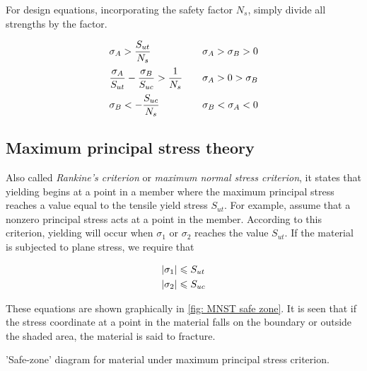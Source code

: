 \documentclass[
10pt,
a4paper,
openany,
svgnames,
]{kaobook} %
\begin{document}
For design equations, incorporating the safety factor $N_s$, simply divide all strengths by the factor.

\begin{equation}
  \begin{array}{l l l}
  \sigma_A > \dfrac{S_{ut}}{N_s} & & \sigma_A > \sigma_B > 0 \\[10pt]
  \dfrac{\sigma_A}{S_{ut}} - \dfrac{\sigma_B}{S_{uc}} > \dfrac{1}{N_s} & & \sigma_A > 0 > \sigma_B \\[10pt]
    \sigma_B <  -\dfrac{S_{uc}}{N_s} & & \sigma_B < \sigma_A < 0
  \end{array}
\end{equation}

\subsection{Maximum principal stress theory}

Also called \emph{Rankine’s criterion} or \emph{maximum normal stress criterion}, it states that yielding begins at a point in a member where the maximum principal stress reaches a value equal to the tensile yield stress $S_{ut}$. For example, assume that a nonzero principal stress acts at a point in the member. According to this criterion, yielding will occur when $\sigma_1$ or $\sigma_2$ reaches the value $S_{ut}$. If the material is subjected to plane stress, we require that

\[\begin{gathered}
    \left| \sigma _1 \right| \leqslant S_{ut} \hfill \\
    \left| \sigma _2 \right| \leqslant S_{uc} \hfill \\ 
  \end{gathered} \]

These equations are shown graphically in \cref{fig: MNST safe zone}. It is seen that if the stress coordinate at a point in the material falls on the boundary or outside the shaded area, the material is said to fracture.

\begin{marginfigure}
  \centering
  \caption{'Safe-zone' diagram for material under maximum principal stress criterion.}
  \label{fig: MNST safe zone}
\end{marginfigure}
\end{document}
